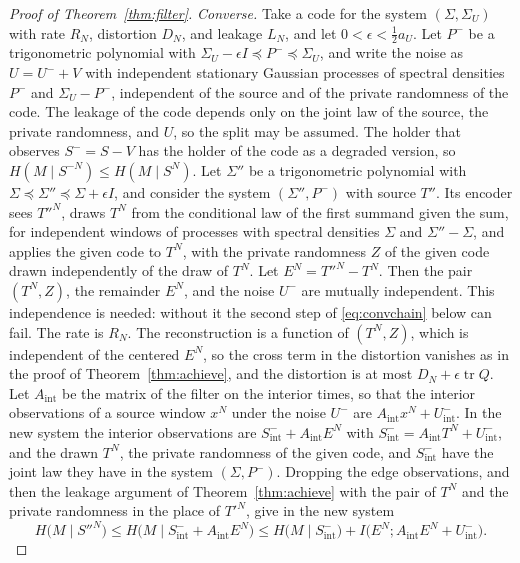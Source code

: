 \documentclass[11pt,onecolumn]{IEEEtran}
\newcommand{\tr}{\operatorname{tr}}
\begin{document}
\begin{proof}[Proof of Theorem~\ref{thm:filter}]
\emph{Converse.} Take a code for the system $(\Sigma,\Sigma_U)$ with
rate $R_N$, distortion $D_N$, and leakage $L_N$, and let
$0<\epsilon<\tfrac12a_U$. Let $P^-$ be a trigonometric polynomial with
$\Sigma_U-\epsilon I\preceq P^-\preceq\Sigma_U$, and write the noise as
$U=U^-+V$ with independent stationary Gaussian processes of spectral
densities $P^-$ and $\Sigma_U-P^-$, independent of the source and of the
private randomness of the code. The leakage of the code depends only
on the joint law of the source, the private randomness, and $U$, so
the split may be assumed. The holder that observes
$S^-=S-V$ has the holder of the code as a degraded version, so
$H(M\mid S^{-N})\le H(M\mid S^N)$. Let $\Sigma''$ be a trigonometric
polynomial with $\Sigma\preceq\Sigma''\preceq\Sigma+\epsilon I$, and
consider the system $(\Sigma'',P^-)$ with source $T''$. Its encoder
sees $T''^N$, draws $T^N$ from the conditional law of the first summand
given the sum, for independent windows of processes with spectral
densities $\Sigma$ and $\Sigma''-\Sigma$, and applies the given code to
$T^N$, with the private randomness $Z$ of the given code drawn
independently of the draw of $T^N$. Let $E^N=T''^N-T^N$. Then the pair
$(T^N,Z)$, the remainder $E^N$, and the noise $U^-$ are mutually
independent. This independence is needed: without it the second step
of \eqref{eq:convchain} below can fail. The rate is $R_N$. The
reconstruction is a function of $(T^N,Z)$, which is independent of the
centered $E^N$, so the cross term in the distortion vanishes as in the
proof of Theorem~\ref{thm:achieve}, and the distortion is at most
$D_N+\epsilon\tr Q$. Let $A_{\mathrm{int}}$ be the matrix of the filter on the interior
times, so that the interior observations of a source window $x^N$ under
the noise $U^-$ are $A_{\mathrm{int}}x^N+U^-_{\mathrm{int}}$. In the new
system the interior observations are
$S^-_{\mathrm{int}}+A_{\mathrm{int}}E^N$ with
$S^-_{\mathrm{int}}=A_{\mathrm{int}}T^N+U^-_{\mathrm{int}}$, and the drawn
$T^N$, the private randomness of the given code, and
$S^-_{\mathrm{int}}$ have the joint law they have in the system
$(\Sigma,P^-)$. Dropping the edge observations, and then the leakage
argument of Theorem~\ref{thm:achieve} with the pair of $T^N$ and the
private randomness in the place of $T'^N$, give in the new system
\begin{equation}
H\bigl(M\mid S''^N\bigr)\le H\bigl(M\mid S^-_{\mathrm{int}}+A_{\mathrm{int}}E^N\bigr)
\le H\bigl(M\mid S^-_{\mathrm{int}}\bigr)+I\bigl(E^N;A_{\mathrm{int}}E^N+U^-_{\mathrm{int}}\bigr).
\label{eq:convchain}
\end{equation}

\end{proof}
\end{document}
